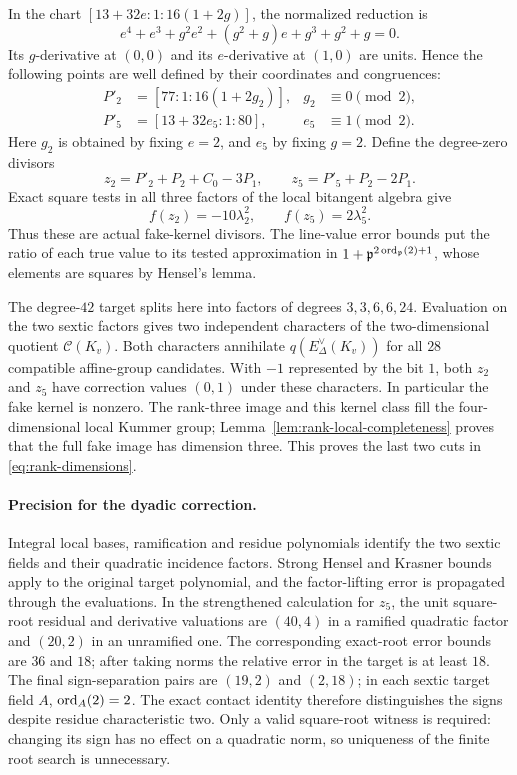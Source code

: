 In the chart $[13+32e:1:16(1+2g)]$, the normalized reduction is
\[
       e^4+e^3+g^2e^2+(g^2+g)e+g^3+g^2+g=0.
\]
Its $g$-derivative at $(0,0)$ and its $e$-derivative at $(1,0)$ are
units.  Hence the following points are well defined by their coordinates
and congruences:
\[
 \begin{aligned}
 P'_2&=[77:1:16(1+2g_2)],&g_2&\equiv0\pmod2,\\
 P'_5&=[13+32e_5:1:80],&e_5&\equiv1\pmod2.
 \end{aligned}
\]
Here $g_2$ is obtained by fixing $e=2$, and $e_5$ by fixing $g=2$.
Define the degree-zero divisors
\[
 z_2=P'_2+P_2+C_0-3P_1,\qquad
 z_5=P'_5+P_2-2P_1.
\]
Exact square tests in all three factors of the local bitangent algebra
give
\[
                    f(z_2)=-10\lambda_2^2,\qquad
                    f(z_5)=2\lambda_5^2.
\]
Thus these are actual fake-kernel divisors.  The line-value error bounds
put the ratio of each true value to its tested approximation in
$1+\mathfrak p^{2\operatorname{ord}_{\mathfrak p}(2)+1}$, whose elements are squares
by Hensel's lemma.

The degree-$42$ target splits here into factors of degrees
$3,3,6,6,24$.  Evaluation on the two sextic factors gives two independent
characters of the two-dimensional quotient $\mathcal C(K_v)$.
Both characters annihilate $q(E_\Delta^\vee(K_v))$ for all $28$ compatible
affine-group candidates.  With $-1$ represented by the bit $1$, both
$z_2$ and $z_5$ have correction values $(0,1)$ under these characters.
In particular the fake kernel is nonzero.  The rank-three image and
this kernel class fill the four-dimensional local Kummer group;
Lemma~\ref{lem:rank-local-completeness} proves that the full fake image
has dimension three.  This proves the last two cuts in
\eqref{eq:rank-dimensions}.

\paragraph{Precision for the dyadic correction.}
Integral local bases, ramification and residue polynomials identify the
two sextic fields and their quadratic incidence factors.  Strong
Hensel and Krasner bounds apply to the original target polynomial,
and the factor-lifting error is propagated through the evaluations.
In the strengthened calculation for $z_5$, the unit square-root
residual and derivative valuations are $(40,4)$ in a ramified quadratic
factor and $(20,2)$ in an unramified one.  The corresponding exact-root
error bounds are $36$ and $18$; after taking norms the relative error
in the target is at least $18$.  The final sign-separation pairs are
$(19,2)$ and $(2,18)$; in each sextic target field $A$,
$\operatorname{ord}_A(2)=2$.  The exact contact identity
therefore distinguishes the signs despite residue characteristic two.
Only a valid square-root witness is required: changing its sign has
no effect on a quadratic norm, so uniqueness of the finite root search
is unnecessary.

